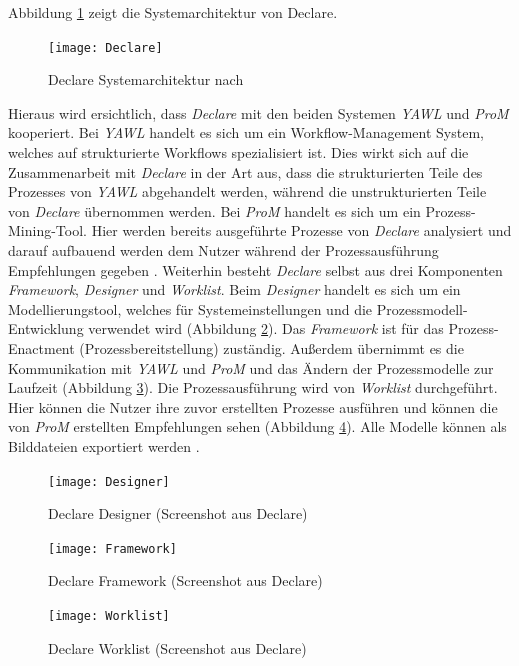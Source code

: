 Abbildung \ref{fig:Declare} zeigt die Systemarchitektur von Declare.

\begin{figure}[H]
\begin{center}
  \texttt{[image: Declare]} %
  \caption{Declare Systemarchitektur nach \cite{pesic2007declare}}
  \label{fig:Declare}
\end{center}
\end{figure} 

Hieraus wird ersichtlich, dass \textit{Declare} mit den beiden Systemen \textit{YAWL} und \textit{ProM} kooperiert. Bei \textit{YAWL} handelt es sich um ein Workflow-Management System, welches auf strukturierte Workflows spezialisiert ist. Dies wirkt sich auf die Zusammenarbeit mit \textit{Declare} in der Art aus, dass die strukturierten Teile des Prozesses von \textit{YAWL} abgehandelt werden, während die unstrukturierten Teile von \textit{Declare} übernommen werden. Bei \textit{ProM} handelt es sich um ein Prozess-Mining-Tool. Hier werden bereits ausgeführte Prozesse von \textit{Declare} analysiert und darauf aufbauend werden dem Nutzer während der Prozessausführung Empfehlungen gegeben \cite{pesic2007declare}. \newline
Weiterhin besteht \textit{Declare} selbst aus drei Komponenten \textit{Framework}, \textit{Designer} und \textit{Worklist}.  Beim \textit{Designer} handelt es sich um ein Modellierungstool, welches für Systemeinstellungen und die Prozessmodell-Entwicklung verwendet wird (Abbildung \ref{fig:Designer}). Das \textit{Framework} ist für das Prozess-Enactment (Prozessbereitstellung) zuständig. Außerdem übernimmt es die Kommunikation mit \textit{YAWL} und \textit{ProM} und das Ändern der Prozessmodelle zur Laufzeit (Abbildung \ref{fig:Framework}). Die Prozessausführung wird von \textit{Worklist} durchgeführt. Hier können die Nutzer ihre zuvor erstellten Prozesse ausführen und können die von \textit{ProM} erstellten Empfehlungen sehen (Abbildung \ref{fig:Worklist}). Alle Modelle können als Bilddateien exportiert werden \cite{pesic2007declare}.



\begin{figure}[H]
\begin{center}
  \texttt{[image: Designer]} %
  \caption{Declare Designer (Screenshot aus Declare)}
  \label{fig:Designer}
\end{center}
\end{figure} 


\begin{figure}[H]
\begin{center}
  \texttt{[image: Framework]} %
  \caption{Declare Framework (Screenshot aus Declare)}
  \label{fig:Framework}
\end{center}
\end{figure} 

\begin{figure}[H]
\begin{center}
  \texttt{[image: Worklist]} %
  \caption{Declare Worklist (Screenshot aus Declare)}
  \label{fig:Worklist}
\end{center}
\end{figure} 





 









